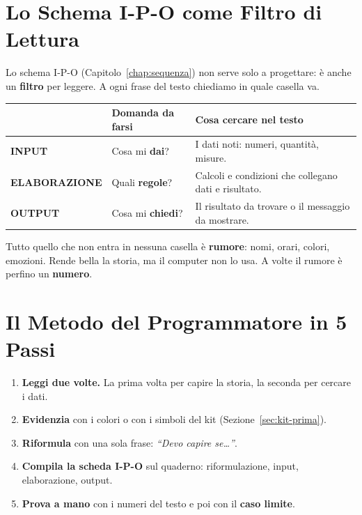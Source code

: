 \section{Lo Schema I-P-O come Filtro di Lettura}

Lo schema I-P-O (Capitolo~\ref{chap:sequenza}) non serve solo a progettare: è anche un \textbf{filtro} per leggere. A ogni frase del testo chiediamo in quale casella va.

\begin{center}
\renewcommand{\arraystretch}{1.45}
\begin{tabular}{|l|l|p{6.6cm}|}
\hline
\rowcolor{PiazzaPrimary!15}
 & \textbf{Domanda da farsi} & \textbf{Cosa cercare nel testo} \\
\hline
\textbf{\color{BoxBlue}INPUT} & Cosa mi \textbf{dai}? & I dati noti: numeri, quantità, misure. \\
\hline
\textbf{\color{BoxAmber}ELABORAZIONE} & Quali \textbf{regole}? & Calcoli e condizioni che collegano dati e risultato. \\
\hline
\textbf{\color{PiazzaPrimary}OUTPUT} & Cosa mi \textbf{chiedi}? & Il risultato da trovare o il messaggio da mostrare. \\
\hline
\end{tabular}
\end{center}

\begin{concetto}[Il Rumore]
Tutto quello che non entra in nessuna casella è \textbf{rumore}: nomi, orari, colori, emozioni. Rende bella la storia, ma il computer non lo usa. A volte il rumore è perfino un \textbf{numero}.
\end{concetto}

\section{Il Metodo del Programmatore in 5 Passi}

\begin{enumerate}
  \item \textbf{Leggi due volte.} La prima volta per capire la storia, la seconda per cercare i dati.
  \item \textbf{Evidenzia} con i colori o con i simboli del kit (Sezione~\ref{sec:kit-prima}).
  \item \textbf{Riformula} con una sola frase: \emph{``Devo capire se\dots''}.
  \item \textbf{Compila la scheda I-P-O} sul quaderno: riformulazione, input, elaborazione, output.
  \item \textbf{Prova a mano} con i numeri del testo e poi con il \textbf{caso limite}.
\end{enumerate}

